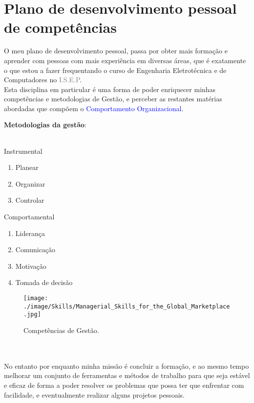 \section{Plano de desenvolvimento pessoal de competências}
\qquad O meu plano de desenvolvimento pessoal, passa por obter mais formação e aprender com pessoas com mais experiência em diversas áreas, que é exatamente o que estou a fazer frequentando o curso de Engenharia Eletrotécnica e de Computadores no \textcolor{gray}{I.S.E.P}.\\
Esta disciplina em particular é uma forma de poder enriquecer minhas competências e metodologias de Gestão, e perceber as restantes matérias abordadas que compõem o \textcolor{blue}{Comportamento Organizacional}.\\
\begin{minipage}{8.5cm}
	\textbf{Metodologias da gestão}: \cite{book_9}\\
	\\
	\begin{minipage}{3.1cm}
		Instrumental
		\begin{enumerate}
			\setlength\itemsep{-0.3em}
			\item Planear
			\item Organizar
			\item Controlar\\
		\end{enumerate}
	\end{minipage}
	\begin{minipage}{5cm}
		Comportamental
		\begin{enumerate}
			\setlength\itemsep{-0.3em}
			\item Liderança
			\item Comunicação
			\item Motivação
			\item Tomada de decisão
		\end{enumerate}
	\end{minipage}
\end{minipage}
\begin{minipage}{10cm}
\begin{figure}[H]
	\flushleft
	\texttt{[image: ./image/Skills/Managerial\_Skills\_for\_the\_Global\_Marketplace.jpg]}
	\caption{Competências de Gestão. \cite{book_6}}
\end{figure}
\end{minipage}
\\
\\
No entanto por enquanto minha missão é concluir a formação, e ao mesmo tempo melhorar um conjunto de ferramentas e métodos de trabalho para que seja estável e eficaz de forma a poder resolver os problemas que possa ter que enfrentar com facilidade, e eventualmente realizar alguns projetos pessoais. \\
\\
\newpage
